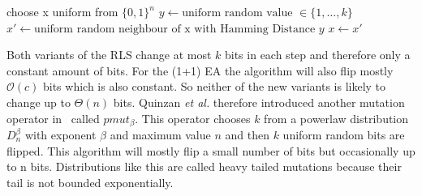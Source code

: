\begin{algorithm}[bt]
      \caption{\textsc{\RLSR}}\label{alg:rlsR}

      \DontPrintSemicolon %

      \BlankLine
      choose x uniform from ${\{0,1\}}^n$\;
      {
      $y \leftarrow \text{uniform random value }\in \{1,\dots,k\}$\;
      $x' \leftarrow \text{uniform random neighbour of x with Hamming Distance } y$\;
      {
      {
            $x \leftarrow x'$\;
      }
      }
      }
\end{algorithm}

Both variants of the RLS change at most $k$ bits in each step and therefore only a constant amount of bits.
For the (1+1) EA the algorithm will also flip mostly $\mathcal{O}(c)$ bits which is also constant.
So neither of the new variants is likely to change up to $\Theta(n)$ bits.
Quinzan \textit{et al.} therefore introduced another mutation operator in~\cite{friedrich2018evolutionary} called $pmut_\beta$.
This operator chooses $k$ from a powerlaw distribution $D^\beta_n$ with exponent $\beta$ and maximum value $n$ and then $k$ uniform random bits are flipped.
This algorithm will mostly flip a small number of bits but occasionally up to n bits.
Distributions like this are called heavy tailed mutations because their tail is not bounded exponentially.
